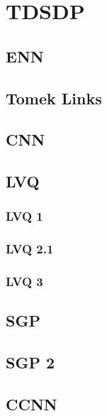 \chapter{TDSDP}

\section{ENN}
\section{Tomek Links}
\section{CNN}
\section{LVQ}
\subsection{LVQ 1}
\subsection{LVQ 2.1}
\subsection{LVQ 3}
\section{SGP}
\section{SGP 2}
\section{CCNN}
